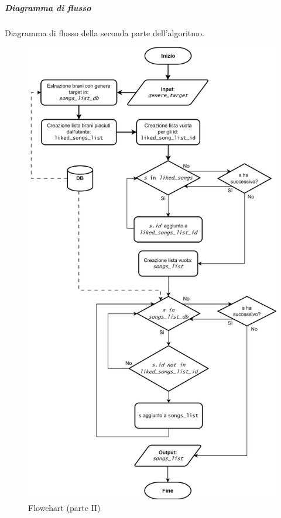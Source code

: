 \newpage
\subparagraph{Diagramma di flusso}
Diagramma di flusso della seconda parte dell'algoritmo.
\begin{figure} [H]
    \centering
    \includegraphics[scale=0.62]{images/flowchart-Parte II.png}
    \caption{Flowchart (parte II)}
    \label{fig-fc2}
\end{figure}




\newpage
